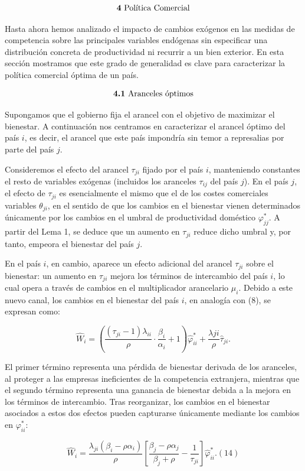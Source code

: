 \documentclass[10pt,a4paper]{article}
\begin{document}
$$\text{\textbf{4} Política Comercial}$$

Hasta ahora hemos analizado el impacto de cambios exógenos en las medidas de competencia sobre las principales variables endógenas sin especificar una distribución concreta de productividad ni recurrir a un bien exterior. En esta sección mostramos que este grado de generalidad es clave para caracterizar la política comercial óptima de un país.

$$\text{\textbf{4.1} Aranceles óptimos}$$

Supongamos que el gobierno fija el arancel con el objetivo de maximizar el bienestar. A continuación nos centramos en caracterizar el arancel óptimo del país $i$, es decir, el arancel que este país impondría sin temor a represalias por parte del país $j$.

Consideremos el efecto del arancel $\tau_{ji}$ fijado por el país $i$, manteniendo constantes el resto de variables exógenas (incluidos los aranceles $\tau_{ij}$ del país $j$). En el país $j$, el efecto de $\tau_{ji}$ es esencialmente el mismo que el de los costes comerciales variables $\theta_{ji}$, en el sentido de que los cambios en el bienestar vienen determinados únicamente por los cambios en el umbral de productividad doméstico $\varphi_{jj}^*$. A partir del Lema 1, se deduce que un aumento en $\tau_{ji}$ reduce dicho umbral y, por tanto, empeora el bienestar del país $j$.

En el país $i$, en cambio, aparece un efecto adicional del arancel $\tau_{ji}$ sobre el bienestar: un aumento en $\tau_{ji}$ mejora los términos de intercambio del país $i$, lo cual opera a través de cambios en el multiplicador arancelario $\mu_i$. Debido a este nuevo canal, los cambios en el bienestar del país $i$, en analogía con (8), se expresan como:

$$\hat{W}_i =\left(\frac{(\tau_{ji}-1)\lambda_{ii}}{\rho}\cdot\frac{\beta_i}{\alpha_i}+1\right)\hat{\varphi}_{ii}^*+\frac{\lambda{ji}}{\rho}\hat{\tau}_{ji}.$$

El primer término representa una pérdida de bienestar derivada de los aranceles, al proteger a las empresas ineficientes de la competencia extranjera, mientras que el segundo término representa una ganancia de bienestar debida a la mejora en los términos de intercambio. Tras reorganizar, los cambios en el bienestar asociados a estos dos efectos pueden capturarse únicamente mediante los cambios en $\varphi_{ii}^*$:

$$\hat{W}_i =\frac{\lambda_{ji}(\beta_i - \rho\alpha_i)}{\rho}\left[\frac{\beta_j -\rho\alpha_j}{\beta_j+\rho}-\frac{1}{\tau_{ji}}\right]\hat{\varphi}_{ii}^*.(14)$$
\end{document}
